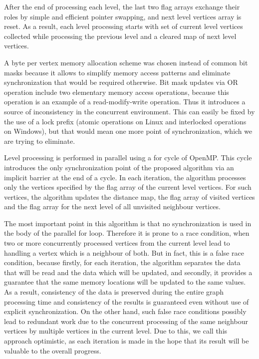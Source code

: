 \documentclass[letterpaper]{article}
\begin{document}
			After the end of processing each level, the last two flag arrays exchange their roles by simple and efficient pointer swapping, and next level vertices array is reset.
			As a result, each level processing starts with set of current level vertices collected while processing the previous level and a cleared map of next level vertices. 

			A byte per vertex memory allocation scheme was chosen instead of common bit masks because it allows to simplify memory access patterns and eliminate synchronization that would be required otherwise.
			Bit mask updates via OR operation include two elementary memory access operations, because this operation is an example of a read-modify-write operation.
			Thus it introduces a source of inconsistency in the concurrent environment.
			This can easily be fixed by the use of a lock prefix (atomic operations on Linux and interlocked operations on Windows), but that would mean one more point of synchronization, which we are trying to eliminate.
			
			Level processing is performed in parallel using a for cycle of OpenMP.
			This cycle introduces the only synchronization point of the proposed algorithm via an implicit barrier at the end of a cycle.
			In each iteration, the algorithm processes only the vertices specified by the flag array of the current level vertices.
			For such vertices, the algorithm updates the distance map, the flag array of visited vertices and the flag array for the next level of all unvisited neighbour vertices.
			
			The most important point in this algorithm is that no synchronization is used in the body of the parallel for loop.
			Therefore it is prone to a race condition, when two or more concurrently processed vertices from the current level lead to handling a vertex which is a neighbour of both.
			But in fact, this is a false race condition, because firstly, for each iteration, the algorithm separates the data that will be read and the data which will be updated, and secondly, it provides a guarantee that the same memory locations will be updated to the same values.
			As a result, consistency of the data is preserved during the entire graph processing time and consistency of the results is guaranteed even without use of explicit synchronization.
			On the other hand, such false race conditions possibly lead to redundant work due to the concurrent processing of the same neighbour vertices by multiple vertices in the current level.
			Due to this, we call this approach optimistic, as each iteration is made in the hope that its result will be valuable to the overall progress.  
			
\end{document}
